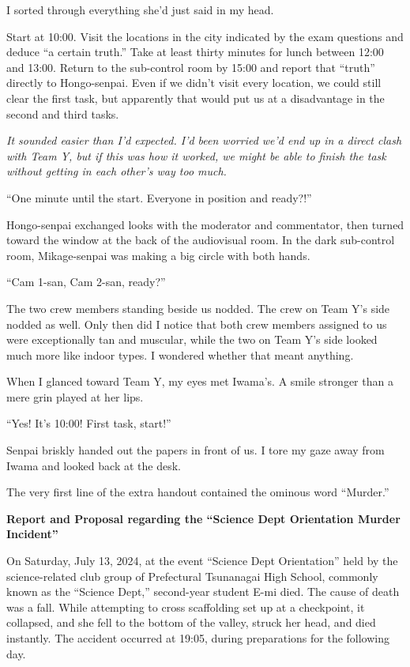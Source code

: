 \documentclass[
    a4paper,
    12pt,
    twoside,
    openany,
    UTF8,
    fontset=windows
]{ctexbook}
\begin{document}
I sorted through everything she'd just said in my head.

Start at 10:00. Visit the locations in the city indicated by the exam questions and deduce ``a certain truth.'' Take at least thirty minutes for lunch between 12:00 and 13:00. Return to the sub-control room by 15:00 and report that ``truth'' directly to Hongo-senpai. Even if we didn't visit every location, we could still clear the first task, but apparently that would put us at a disadvantage in the second and third tasks.

\textit{It sounded easier than I'd expected. I'd been worried we'd end up in a direct clash with Team Y, but if this was how it worked, we might be able to finish the task without getting in each other's way too much.}

``One minute until the start. Everyone in position and ready?!''

Hongo-senpai exchanged looks with the moderator and commentator, then turned toward the window at the back of the audiovisual room. In the dark sub-control room, Mikage-senpai was making a big circle with both hands.

``Cam 1-san, Cam 2-san, ready?''

The two crew members standing beside us nodded. The crew on Team Y's side nodded as well. Only then did I notice that both crew members assigned to us were exceptionally tan and muscular, while the two on Team Y's side looked much more like indoor types. I wondered whether that meant anything.

When I glanced toward Team Y, my eyes met Iwama's. A smile stronger than a mere grin played at her lips.

``Yes! It's 10:00! First task, start!''

Senpai briskly handed out the papers in front of us. I tore my gaze away from Iwama and looked back at the desk.

The very first line of the extra handout contained the ominous word ``Murder.''

\begin{center}
\textbf{Report and Proposal regarding the ``Science Dept Orientation Murder Incident''}
\end{center}

On Saturday, July 13, 2024, at the event ``Science Dept Orientation'' held by the science-related club group of Prefectural Tsunanagai High School, commonly known as the ``Science Dept,'' second-year student E-mi died. The cause of death was a fall. While attempting to cross scaffolding set up at a checkpoint, it collapsed, and she fell to the bottom of the valley, struck her head, and died instantly. The accident occurred at 19:05, during preparations for the following day.
\end{document}
